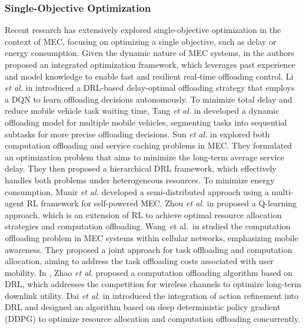 \documentclass[10pt, journal,letterpaper]{IEEEtran}
\begin{document}
\subsubsection{Single-Objective Optimization} 
Recent research has extensively explored single-objective optimization in the context of MEC, focusing on optimizing a single objective, such as delay or energy consumption. 
Given the dynamic nature of MEC systems, in \cite{li2022integrated} the authors proposed an integrated optimization framework, which leverages past experience and model knowledge to enable fast and resilient real-time offloading control. 
Li \textit{et al.} in \cite{li2020joint} introduced a DRL-based delay-optimal offloading strategy that employs a DQN to learn offloading decisions autonomously. 
To minimize total delay and reduce mobile vehicle task waiting time, Tang \textit{et al.} in \cite{tang2022double} developed a dynamic offloading model for multiple mobile vehicles, segmenting tasks into sequential subtasks for more precise offloading decisions.
Sun \textit{et al.} in \cite{sun2024hierarchical} explored both computation offloading and service caching problems in MEC. They formulated an optimization problem that aims to minimize the long-term average service delay. They then proposed a hierarchical DRL framework, which effectively handles both problems under heterogeneous resources.
To minimize energy consumption, Munir \textit{et al.} \cite{munir2021multi} developed a semi-distributed approach using a multi-agent RL framework for self-powered MEC. 
Zhou \textit{et al.} in \cite{zhou2021deep} proposed a Q-learning approach, which is an extension of RL to achieve optimal resource allocation strategies and computation offloading.
Wang et al. in \cite{wang2020reinforcement} studied the computation offloading problem in MEC systems within cellular networks, emphasizing mobile awareness. They proposed a joint approach for task offloading and computation allocation, aiming to address the task offloading costs associated with user mobility. 
In \cite{zhao2019deep}, Zhao \textit{et al.} proposed a computation offloading algorithm based on DRL, which addresses the competition for wireless channels to optimize long-term downlink utility.
Dai \textit{et al.} in \cite{dai2020edge} introduced the integration of action refinement into DRL and designed an algorithm based on deep deterministic policy gradient (DDPG) to optimize resource allocation and computation offloading concurrently.

\end{document}
